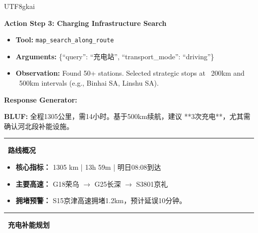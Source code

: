 \begin{CJK*}{UTF8}{gkai}
\begin{tcolorbox}[
    breakable,
    enhanced,
    colframe=color_amapblue,
    colback=mycolor,
    coltitle=white,
    title = {\textbf{Case Study: EV Inter-provincial Travel Guide}},
    fonttitle=\bfseries
]
\textbf{Action Step 3: Charging Infrastructure Search}
\begin{itemize}[leftmargin=12pt, itemsep=0pt]
  \item \textbf{Tool:} \texttt{map\_search\_along\_route}
  \item \textbf{Arguments:} \{``query'': ``充电站'', ``transport\_mode'': ``driving''\}
  \item \textbf{Observation:} Found 50+ stations. Selected strategic stops at ~200km and ~500km intervals (e.g., Binhai SA, Linshu SA).
\end{itemize}

\vspace{5pt}

\textbf{Response Generator:}
\begin{tcolorbox}[
    breakable, %
    colback=white, 
    colframe=color_amapblue!30!white, 
    arc=4pt, 
    boxrule=1pt, 
    left=4pt, right=4pt, top=4pt, bottom=4pt
]
    \small
    \textbf{BLUF:} 全程1305公里，需14小时。基于500km续航，建议 **3次充电**，尤其需确认河北段补能设施。
    
    \par\noindent\rule{\textwidth}{0.4pt}
    
    \textbf{\textcolor{color_amapblue}{\faRoute\ 路线概况}}
    \begin{itemize}[leftmargin=12pt, itemsep=2pt, topsep=2pt]
        \item \textbf{核心指标：} 1305 km | 13h 59m | 明日08:08到达
        \item \textbf{主要高速：} G18荣乌 $\rightarrow$ G25长深 $\rightarrow$ S3801京礼
        \item \textbf{拥堵预警：} S15京津高速拥堵1.2km，预计延误10分钟。
    \end{itemize}
    
    \par\noindent\rule{\textwidth}{0.4pt}
    
    \textbf{\textcolor{color_amapblue}{\faChargingStation\ 充电补能规划}}
    \begin{center}
    \renewcommand{\arraystretch}{1.2}
    \end{center}


\end{tcolorbox}
\end{tcolorbox}
\end{CJK*}
